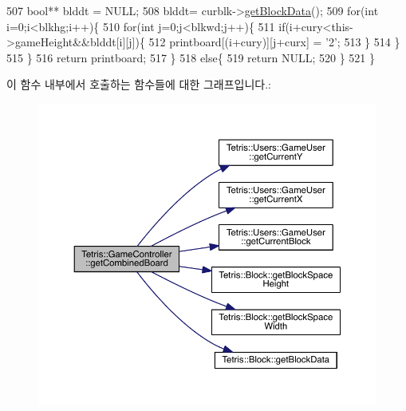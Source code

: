 \begin{DoxyCode}
507                 \textcolor{keywordtype}{bool}** blddt = NULL;
508                 blddt= curblk->\hyperlink{class_tetris_1_1_block_a9bd2c3d6ccacff9a5f56f72336ba324f}{getBlockData}();
509                 \textcolor{keywordflow}{for}(\textcolor{keywordtype}{int} i=0;i<blkhg;i++)\{
510                     \textcolor{keywordflow}{for}(\textcolor{keywordtype}{int} j=0;j<blkwd;j++)\{
511                         \textcolor{keywordflow}{if}(i+cury<this->gameHeight&&blddt[i][j])\{
512                             printboard[(i+cury)][j+curx] = \textcolor{charliteral}{'2'};
513                         \}
514                     \}
515                 \}
516                 \textcolor{keywordflow}{return} printboard;
517             \}
518             \textcolor{keywordflow}{else}\{
519                 \textcolor{keywordflow}{return} NULL;
520             \}
521         \}
\end{DoxyCode}
이 함수 내부에서 호출하는 함수들에 대한 그래프입니다.\+:
\nopagebreak
\begin{figure}[H]
\begin{center}
\leavevmode
\includegraphics[width=350pt]{db/dd2/class_tetris_1_1_game_controller_a6c22f25017881f6150428b62e4607310_cgraph}
\end{center}
\end{figure}
\mbox{\label{class_tetris_1_1_game_controller_a10163479e02572450b886ff0654078b4}} 
